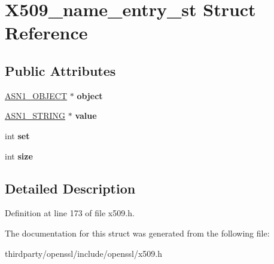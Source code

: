 \hypertarget{struct_x509__name__entry__st}{}\section{X509\+\_\+name\+\_\+entry\+\_\+st Struct Reference}
\label{struct_x509__name__entry__st}
\subsection*{Public Attributes}
\begin{DoxyCompactItemize}
\item 
\mbox{\label{struct_x509__name__entry__st_afb5c2cccc0186d9b6c232d1abee1600d}} 
\hyperlink{structasn1__object__st}{A\+S\+N1\+\_\+\+O\+B\+J\+E\+CT} $\ast$ {\bfseries object}
\item 
\mbox{\label{struct_x509__name__entry__st_ac667219a50c24b022ad59fbd4b0161dd}} 
\hyperlink{structasn1__string__st}{A\+S\+N1\+\_\+\+S\+T\+R\+I\+NG} $\ast$ {\bfseries value}
\item 
\mbox{\label{struct_x509__name__entry__st_a9c2a931466331baa5b1566029e4e2159}} 
int {\bfseries set}
\item 
\mbox{\label{struct_x509__name__entry__st_a26441098da53088784c4eb95d3a2d2f7}} 
int {\bfseries size}
\end{DoxyCompactItemize}


\subsection{Detailed Description}


Definition at line 173 of file x509.\+h.



The documentation for this struct was generated from the following file\+:\begin{DoxyCompactItemize}
\item 
thirdparty/openssl/include/openssl/x509.\+h\end{DoxyCompactItemize}
